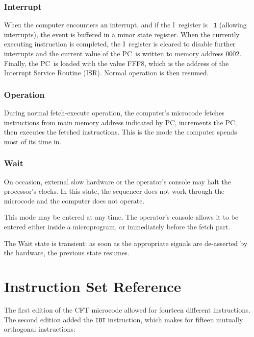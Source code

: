 \documentclass[11pt,a4paper,twocolumns]{article}
\newcommand\hex[1]{\textsf{#1}}
\newcommand\register[1]{\textsf{#1}}
\newcommand\Ireg{\register{I}}
\newcommand\PC{\register{PC}}
\begin{document}
\subsubsection{Interrupt}

When the computer encounters an interrupt, and if the \Ireg\ register is {\tt
  1} (allowing interrupts), the event is buffered in a minor state
register. When the currently executing instruction is completed, the
\Ireg\ register is cleared to disable further interrupts and the current value
of the \PC\ is written to memory address \hex{0002}. Finally, the \PC\ is
loaded with the value \hex{FFF8}, which is the address of the Interrupt Service
Routine (ISR). Normal operation is then resumed.

\subsubsection{Operation}

During normal fetch-execute operation, the computer's microcode
fetches instructions from main memory address indicated by \PC,
increments the \PC, then executes the fetched instructions. This is the
mode the computer spends most of its time in.

\subsubsection{Wait}

On occasion, external slow hardware or the operator's console may halt
the processor's clocks. In this state, the sequencer does not work
through the microcode and the computer does not operate.

This mode may be entered at any time. The operator's console allows it
to be entered either inside a microprogram, or immediately before the
fetch part.

The Wait state is transient: as soon as the appropriate signals are
de-asserted by the hardware, the previous state resumes.

\section{Instruction Set Reference}

The first edition of the CFT microcode allowed for fourteen different
instructions. The second edition added the {\tt IOT} instruction,
which makes for fifteen mutually orthogonal instructions:
\end{document}
